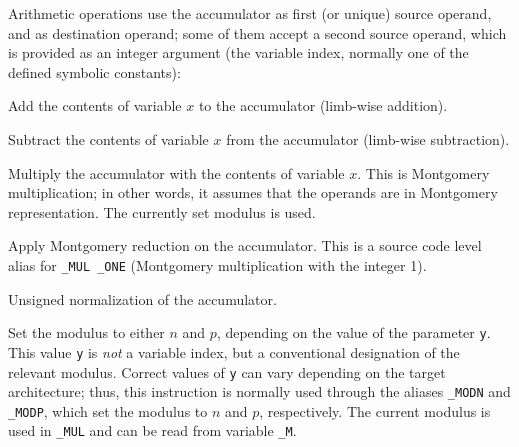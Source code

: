 \documentclass{llncs}
\begin{document}
Arithmetic operations use the accumulator as first (or unique) source
operand, and as destination operand; some of them accept a second source
operand, which is provided as an integer argument (the variable index,
normally one of the defined symbolic constants):
\begin{codedesc3}

    \item[\_ADD x] Add the contents of variable $x$ to the accumulator
    (limb-wise addition).

    \item[\_SUB x] Subtract the contents of variable $x$ from the accumulator
    (limb-wise subtraction).

    \item[\_MUL x] Multiply the accumulator with the contents of variable
    $x$. This is Montgomery multiplication; in other words, it assumes that
    the operands are in Montgomery representation. The currently set modulus
    is used.

    \item[\_MRED] Apply Montgomery reduction on the accumulator. This is
    a source code level alias for \verb+_MUL _ONE+ (Montgomery multiplication
    with the integer 1).

    \item[\_NORM] Unsigned normalization of the accumulator.

    \item[\_SMOD y] Set the modulus to either $n$ and $p$, depending on
    the value of the parameter \verb+y+. This value \verb+y+ is
    \emph{not} a variable index, but a conventional designation of the
    relevant modulus. Correct values of \verb+y+ can vary depending on
    the target architecture; thus, this instruction is normally used
    through the aliases \verb+_MODN+ and \verb+_MODP+, which set the
    modulus to $n$ and $p$, respectively. The current modulus is used in
    \verb+_MUL+ and can be read from variable \verb+_M+.

\end{codedesc3}
\end{document}
